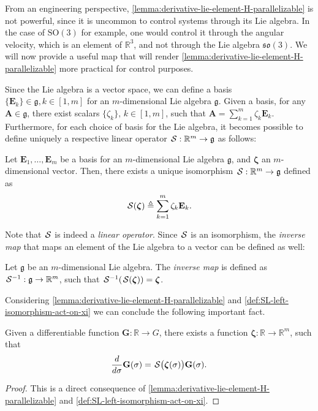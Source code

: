 From an engineering perspective, \cref{lemma:derivative-lie-element-H-parallelizable} is not powerful, since it is uncommon to control systems through its Lie algebra. In the case of $\text{SO}(3)$ for example, one would control it through the angular velocity, which is an element of $\mathbb{R}^3$, and not through the Lie algebra $\mathfrak{so}(3)$. We will now provide a useful map that will render \cref{lemma:derivative-lie-element-H-parallelizable} more practical for control purposes.

Since the Lie algebra is a vector space, we can define a basis $\{\mathbf{E}_k\}\in\mathfrak{g}, k\in[1,m]$ for an $m$-dimensional Lie algebra $\mathfrak{g}$. Given a basis, for any $\mathbf{A} \in\mathfrak{g}$, there exist scalars $\{\zeta_k\},\, k\in[1,m]$, such that $\mathbf{A} = \sum_{k=1}^{m} \zeta_k\mathbf{E}_k$. Furthermore, for each choice of basis for the Lie algebra, it becomes possible to define uniquely a respective linear operator $\SL:\mathbb{R}^{m}\to\mathfrak{g}$ as follows:
\begin{definition}[S map]\label{def:SL-left-isomorphism-act-on-xi}
    Let $\mathbf{E}_1,\dots,\mathbf{E}_m$ be a basis for an $m$-dimensional Lie algebra $\mathfrak{g}$, and $\boldsymbol{\zeta}$ an $m$-dimensional vector. Then, there exists a unique isomorphism $\SL:\mathbb{R}^{m}\to\mathfrak{g}$ defined as
    \begin{equation}
        \SL[\boldsymbol{\zeta}] \triangleq \sum_{k=1}^m\zeta_k\mathbf{E}_k.    
    \end{equation}
    
\end{definition}
Note that $\SL$ is indeed a \emph{linear operator}. Since $\SL$ is an isomorphism, the \emph{inverse map} that maps an element of the Lie algebra to a vector can be defined as well:
\begin{definition}\label{def:inverse-isomorphism-SLinv}
    Let $\mathfrak{g}$ be an $m$-dimensional Lie algebra. The \emph{inverse map} is defined as $\invSL:\mathfrak{g}\to\mathbb{R}^m$, such that $\invSL[\SL[\boldsymbol{\zeta}]] = \boldsymbol{\zeta}$. 
\end{definition}

Considering \autoref{lemma:derivative-lie-element-H-parallelizable} and \autoref{def:SL-left-isomorphism-act-on-xi} we can conclude the following important fact.

\begin{lemma} \label{lemma:very-important-fact}
    Given a differentiable function $\mathbf{\mathbf{G}}:\mathbb{R}\to G$, there exists a function $\boldsymbol{\zeta}:\mathbb{R}\to\mathbb{R}^m$, such that
    \begin{align}
    \label{eq:importantresult}
    \frac{d}{d\sigma} \mathbf{\mathbf{G}}(\sigma)=\SL\bigl(\boldsymbol{\zeta}(\sigma)\bigr)\mathbf{\mathbf{G}}(\sigma). 
\end{align}

\end{lemma}
\begin{proof} This is a direct consequence of \cref{lemma:derivative-lie-element-H-parallelizable} and \cref{def:SL-left-isomorphism-act-on-xi}. 
\end{proof}
